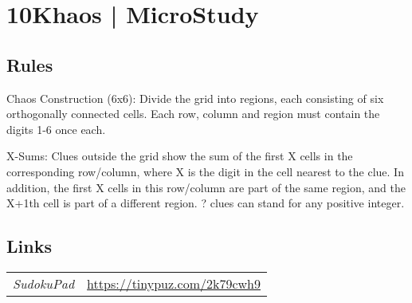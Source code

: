 \section[10Khaos | MicroStudy {[\emph{Sudoku, Chaos Construction, X-Sums}]}]{10Khaos | {\normalfont MicroStudy}}
\label{sec:28-10khaos-microstudy}

\subsection*{Rules}
\begin{markdown}
Chaos Construction (6x6): Divide the grid into regions, each consisting of six orthogonally connected cells. Each row, column and region must contain the digits 1-6 once each.



X-Sums: Clues outside the grid show the sum of the first X cells in the corresponding row/column, where X is the digit in the cell nearest to the clue. In addition, the first X cells in this row/column are part of the same region, and the X+1th cell is part of a different region. ? clues can stand for any positive integer.
\end{markdown}
\subsection*{Links}
\begin{tabularx}{\textwidth}{l X}
\emph{SudokuPad} & \url{https://tinypuz.com/2k79cwh9} \\
\end{tabularx}
\pagebreak
